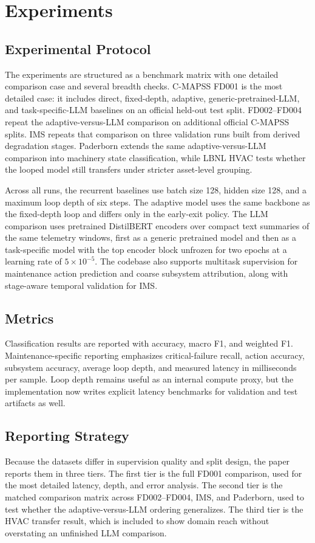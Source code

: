\section{Experiments}
\subsection{Experimental Protocol}
The experiments are structured as a benchmark matrix with one detailed comparison case and several breadth checks. C-MAPSS FD001 is the most detailed case: it includes direct, fixed-depth, adaptive, generic-pretrained-LLM, and task-specific-LLM baselines on an official held-out test split. FD002--FD004 repeat the adaptive-versus-LLM comparison on additional official C-MAPSS splits. IMS repeats that comparison on three validation runs built from derived degradation stages. Paderborn extends the same adaptive-versus-LLM comparison into machinery state classification, while LBNL HVAC tests whether the looped model still transfers under stricter asset-level grouping.

Across all runs, the recurrent baselines use batch size 128, hidden size 128, and a maximum loop depth of six steps. The adaptive model uses the same backbone as the fixed-depth loop and differs only in the early-exit policy. The LLM comparison uses pretrained DistilBERT encoders over compact text summaries of the same telemetry windows, first as a generic pretrained model and then as a task-specific model with the top encoder block unfrozen for two epochs at a learning rate of $5\times10^{-5}$. The codebase also supports multitask supervision for maintenance action prediction and coarse subsystem attribution, along with stage-aware temporal validation for IMS.

\subsection{Metrics}
Classification results are reported with accuracy, macro F1, and weighted F1. Maintenance-specific reporting emphasizes critical-failure recall, action accuracy, subsystem accuracy, average loop depth, and measured latency in milliseconds per sample. Loop depth remains useful as an internal compute proxy, but the implementation now writes explicit latency benchmarks for validation and test artifacts as well.

\subsection{Reporting Strategy}
Because the datasets differ in supervision quality and split design, the paper reports them in three tiers. The first tier is the full FD001 comparison, used for the most detailed latency, depth, and error analysis. The second tier is the matched comparison matrix across FD002--FD004, IMS, and Paderborn, used to test whether the adaptive-versus-LLM ordering generalizes. The third tier is the HVAC transfer result, which is included to show domain reach without overstating an unfinished LLM comparison.

